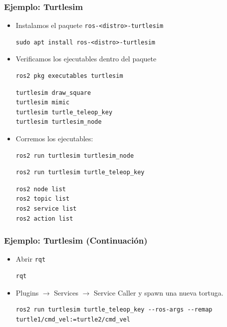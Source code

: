 \begin{frame}[fragile]
    \frametitle{Ejemplo: Turtlesim}
    \scriptsize
    \begin{itemize}

        \item Instalamos el paquete \lstinline[style=bash]{ros-<distro>-turtlesim}
        \begin{lstlisting}[style=bash]
sudo apt install ros-<distro>-turtlesim
        \end{lstlisting}
        \item Verificamos los ejecutables dentro del paquete
        \begin{lstlisting}[style=bash]
ros2 pkg executables turtlesim
        \end{lstlisting}
        \begin{lstlisting}[style=bash]
turtlesim draw_square
turtlesim mimic
turtlesim turtle_teleop_key
turtlesim turtlesim_node
        \end{lstlisting}
        \item Corremos los ejecutables:
        \begin{lstlisting}[style=bash]
ros2 run turtlesim turtlesim_node
        \end{lstlisting}

        \begin{lstlisting}[style=bash]
ros2 run turtlesim turtle_teleop_key
        \end{lstlisting}
        \begin{lstlisting}[style=bash]
ros2 node list
ros2 topic list
ros2 service list
ros2 action list
        \end{lstlisting}
    \end{itemize}    
\end{frame}

\begin{frame}[fragile]
	\frametitle{Ejemplo: Turtlesim (Continuación)}
    
    \begin{itemize}
        \item Abrir \lstinline[style=bash]{rqt}
        \begin{lstlisting}[style=bash]    
rqt
        \end{lstlisting}
        \item Plugins $\rightarrow$ Services $\rightarrow$ Service Caller y spawn una nueva tortuga.
        
        \footnotesize
        \begin{lstlisting}[style=bash]    
ros2 run turtlesim turtle_teleop_key --ros-args --remap turtle1/cmd_vel:=turtle2/cmd_vel
        \end{lstlisting}
    \end{itemize}


\end{frame}

